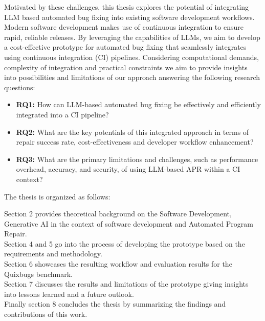 Motivated by these challenges, this thesis explores the potential of integrating LLM based automated bug fixing into existing software development workflows. Modern software development  makes use of continuous integration to ensure rapid, reliable releases. \cite{ugwuezeContinuousIntegrationDeployment2024} By leveraging the capabilities of LLMs, we aim to develop a cost-effective prototype for automated bug fixing that seamlessly integrates using continuous integration (CI) pipelines. Considering computational demands, complexity of integration and practical constraints we aim to provide insights into possibilities and limitations of our approach answering the following research questions:

\begin{itemize}
    \item \textbf{RQ1:} How can LLM-based automated bug fixing be effectively and efficiently integrated into a CI pipeline?
    \item \textbf{RQ2:} What are the key potentials of this integrated approach in terms of repair success rate, cost-effectiveness and developer workflow enhancement?
    \item \textbf{RQ3:} What are the primary limitations and challenges, such as performance overhead, accuracy, and security, of using LLM-based APR within a CI context?
\end{itemize}


The thesis is organized as follows:

Section 2 provides theoretical background on the Software Development, Generative AI in the context of software development and Automated Program Repair.\\
Section 4 and 5 go into the process of developing the prototype based on the requirements and methodology.\\
Section 6 showcases the resulting workflow and evaluation results for the Quixbugs benchmark.\\
Section 7 discusses the results and limitations of the prototype giving insights into lessons learned and a future outlook.\\
Finally section 8 concludes the thesis by summarizing the findings and contributions of this work.
